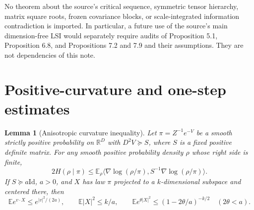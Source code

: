 \documentclass[11pt]{article}
\newtheorem{lemma}[theorem]{Lemma}
\theoremstyle{remark}\newtheorem{remark}[theorem]{Remark}
\newcommand{\E}{\mathbb E}
\newcommand{\R}{\mathbb R}
\newcommand{\Id}{\mathrm{Id}}
\begin{document}
No theorem about the source's critical sequence, symmetric tensor hierarchy,
matrix square roots, frozen covariance blocks, or scale-integrated information
contradiction is imported. In particular, a future use of the source's main
dimension-free LSI would separately require audits of Proposition 5.1,
Proposition 6.8, and Propositions 7.2 and 7.9 and their assumptions. They are
not dependencies of this note.

\section{Positive-curvature and one-step estimates}
\begin{lemma}[Anisotropic curvature inequality]\label{lem:curvature}
Let $\pi=Z^{-1}e^{-V}$ be a smooth strictly positive probability on $\R^D$
with $D^2V\succeq S$, where $S$ is a fixed positive definite matrix.
For any smooth positive probability density $\rho$ whose right side is finite,
\begin{equation}\label{eq:lsi}
2H(\rho\mid\pi)\le
\E_\rho\langle\nabla\log(\rho/\pi),S^{-1}\nabla\log(\rho/\pi)\rangle.
\end{equation}
If $S\succeq a\Id$, $a>0$, and $X$ has law $\pi$ projected to a $k$-dimensional
subspace and centered there, then
\begin{equation}\label{eq:subgauss}
\E e^{v\cdot X}\le e^{|v|^2/(2a)},\qquad
\E|X|^2\le k/a,\qquad
\E e^{\theta|X|^2}\le(1-2\theta/a)^{-k/2}\quad(2\theta<a).
\end{equation}
\end{lemma}
\end{document}
